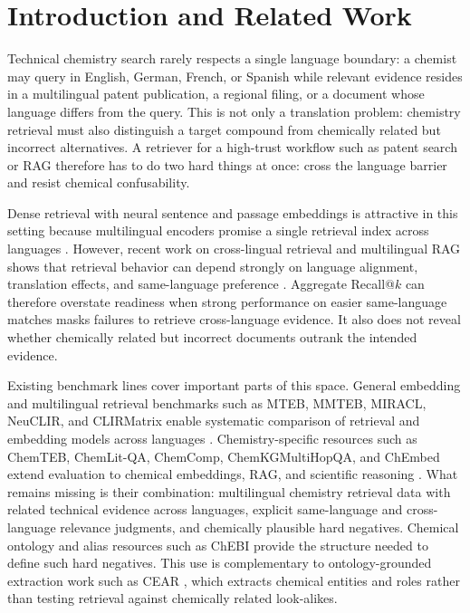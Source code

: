 \section{Introduction and Related Work}

Technical chemistry search rarely respects a single language boundary: a chemist
may query in English, German, French, or Spanish while relevant evidence resides
in a multilingual patent publication, a regional filing, or a document whose
language differs from the query. This is not only a translation problem:
chemistry retrieval must also distinguish a target compound from chemically
related but incorrect alternatives. A retriever for a high-trust workflow such as
patent search or RAG therefore has to do two hard things at once: cross the
language barrier and resist chemical confusability.

Dense retrieval with neural sentence and passage embeddings
\citep{reimers2019sentencebert,karpukhin2020dpr} is attractive in this setting
because multilingual encoders promise a single retrieval index across languages
\citep{labse2022,bgem3_2024}. However, recent work on cross-lingual retrieval
and multilingual RAG shows that retrieval behavior can depend strongly on
language alignment, translation effects, and same-language preference
\citep{whatdrivesclir2025,crosslingualcost2025,bordirlines2024,xrag2025,nepotism2025}.
Aggregate Recall@$k$ can therefore overstate readiness when strong performance
on easier same-language matches masks failures to retrieve cross-language
evidence. It also does not reveal whether chemically related but incorrect
documents outrank the intended evidence.

Existing benchmark lines cover important parts of this space. General embedding
and multilingual retrieval benchmarks such as MTEB, MMTEB, MIRACL, NeuCLIR, and
CLIRMatrix enable systematic comparison of retrieval and embedding models across
languages
\citep{miracl2023,neuclir2023,muennighoff2023mteb,mmteb2025,clirmatrix2020}.
Chemistry-specific resources such as ChemTEB, ChemLit-QA, ChemComp,
ChemKGMultiHopQA, and ChEmbed extend evaluation to chemical embeddings, RAG, and
scientific reasoning
\citep{chemteb2024,chemlitqa2024,khodadad2026chemcomp,astaraki2026iterativerag,chembed2025}.
What remains missing is their combination: multilingual chemistry retrieval data
with related technical evidence across languages, explicit same-language and
cross-language relevance judgments, and chemically plausible hard negatives.
Chemical ontology and alias resources such as ChEBI \citep{chebi2016} provide
the structure needed to define such hard negatives. This use is complementary to
ontology-grounded extraction work such as CEAR \citep{cear2024}, which extracts
chemical entities and roles rather than testing retrieval against chemically
related look-alikes.

